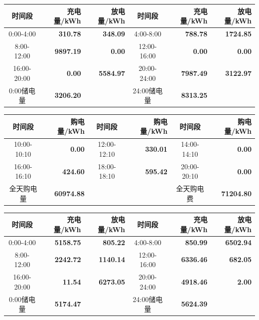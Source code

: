 {\begin{center}
\vspace{0.15\baselineskip}
\begin{tabular}{|c|r|r|c|r|r|}
\hline
时间段 & 充电量/kWh & 放电量/kWh & 时间段 & 充电量/kWh & 放电量/kWh \\
\hline0:00-4:00 & \textbf{310.78} & \textbf{348.09} & 4:00-8:00 & \textbf{788.78} & \textbf{1724.85} \\
\hline8:00-12:00 & \textbf{9897.19} & \textbf{0.00} & 12:00-16:00 & \textbf{0.00} & \textbf{0.00} \\
\hline16:00-20:00 & \textbf{0.00} & \textbf{5584.97} & 20:00-24:00 & \textbf{7987.49} & \textbf{3122.97} \\
\hline0:00储电量 & \textbf{3206.20} & & 24:00储电量 & \textbf{8313.25} & \\
\hline
\end{tabular}
\par{}

\vspace{0.15\baselineskip}
\begin{tabular}{|c|r|c|r|c|r|}
\hline
时间段 & 购电量/kWh & 时间段 & 购电量/kWh & 时间段 & 购电量/kWh \\
\hline10:00-10:10 & \textbf{0.00} & 12:00-12:10 & \textbf{330.01} & 14:00-14:10 & \textbf{0.00} \\
\hline16:00-16:10 & \textbf{424.60} & 18:00-18:10 & \textbf{595.42} & 20:00-20:10 & \textbf{0.00} \\
\hline
全天购电量 & \textbf{60974.88} & & & 全天购电费 & \textbf{71204.80} \\
\hline
\end{tabular}
\par{}

\vspace{0.15\baselineskip}
\begin{tabular}{|c|r|r|c|r|r|}
\hline
时间段 & 充电量/kWh & 放电量/kWh & 时间段 & 充电量/kWh & 放电量/kWh \\
\hline0:00-4:00 & \textbf{5158.75} & \textbf{805.22} & 4:00-8:00 & \textbf{850.99} & \textbf{6502.94} \\
\hline8:00-12:00 & \textbf{2242.72} & \textbf{1140.14} & 12:00-16:00 & \textbf{6336.46} & \textbf{682.05} \\
\hline16:00-20:00 & \textbf{11.54} & \textbf{6273.05} & 20:00-24:00 & \textbf{4918.46} & \textbf{2.00} \\
\hline0:00储电量 & \textbf{5174.47} & & 24:00储电量 & \textbf{5624.39} & \\
\hline
\end{tabular}
\par{}


\end{center}}
